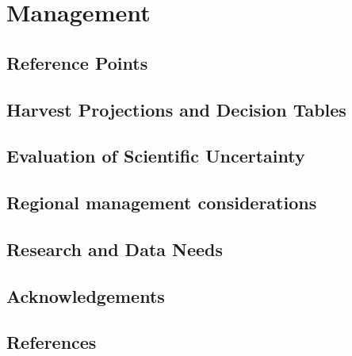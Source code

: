 \documentclass[
]{scrartcl}
\begin{document}
\newpage{}

\hypertarget{management}{%
\section{Management}\label{management}}

\hypertarget{reference-points-1}{%
\subsection{Reference Points}\label{reference-points-1}}

\hypertarget{harvest-projections-and-decision-tables}{%
\subsection{Harvest Projections and Decision
Tables}\label{harvest-projections-and-decision-tables}}

\hypertarget{evaluation-of-scientific-uncertainty}{%
\subsection{Evaluation of Scientific
Uncertainty}\label{evaluation-of-scientific-uncertainty}}

\hypertarget{regional-management-considerations}{%
\subsection{Regional management
considerations}\label{regional-management-considerations}}

\hypertarget{research-and-data-needs-1}{%
\subsection{Research and Data Needs}\label{research-and-data-needs-1}}

\newpage{}

\hypertarget{sec-acknowledgements}{%
\subsection{Acknowledgements}\label{sec-acknowledgements}}

\newpage{}

\hypertarget{references}{%
\subsection{References}\label{references}}
\end{document}
